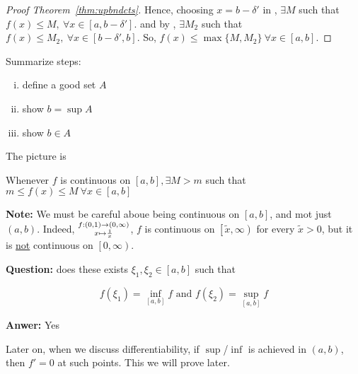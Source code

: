 \begin{proof}[Proof Theorem~\ref{thm:upbndcts}]
    Hence, choosing $x = b - \delta'$ in , $\exists M$ such that $f(x) \leq M,\ \forall x \in \left[a, b - \delta'\right]$.
    and by , $\exists M_2$ such that $f(x) \leq M_2,\ \forall x \in \left[b-\delta', b\right]$.
    So, $f(x) \leq \max\{M, M_2\}\ \forall x \in \left[a, b\right]$.
\end{proof}

Summarize steps:
\begin{enumerate}[(i)]
    \item define a good set $A$
    \item show $b = \sup A$
    \item show $b \in A$
\end{enumerate}

The picture is 
\begin{center}
\end{center}

Whenever $f$ is continuous on $\left[a, b\right], \exists M > m$ such that 
$m \leq f(x) \leq M\ \forall x \in \left[a, b\right]$

\textbf{Note:} We must be careful aboue being continuous on $\left[a, b\right]$,
and mot just $(a, b)$. Indeed, $\substack{f:(0, 1)\rightarrow (0, \infty)\\
x\mapsto \frac{1}{x}}$, $f$ is continuous on $\left[\tilde{x}, \infty\right)$ for every $\tilde{x} > 0$,
but it is \underline{not} continuous on $\left[0, \infty\right)$.
    
\textbf{Question:} does these exists $\xi_1,\xi_2 \in \left[a, b\right]$ such that

$$f(\xi_1) = \inf_{\left[a, b\right]} f \text{ and } f(\xi_2) = \sup_{\left[a, b\right]} f$$

\textbf{Anwer:} Yes

Later on, when we discuss differentiability, if $\sup$/$\inf$ is achieved in $(a, b)$,
then $f' = 0$ at such points. This we will prove later. 

